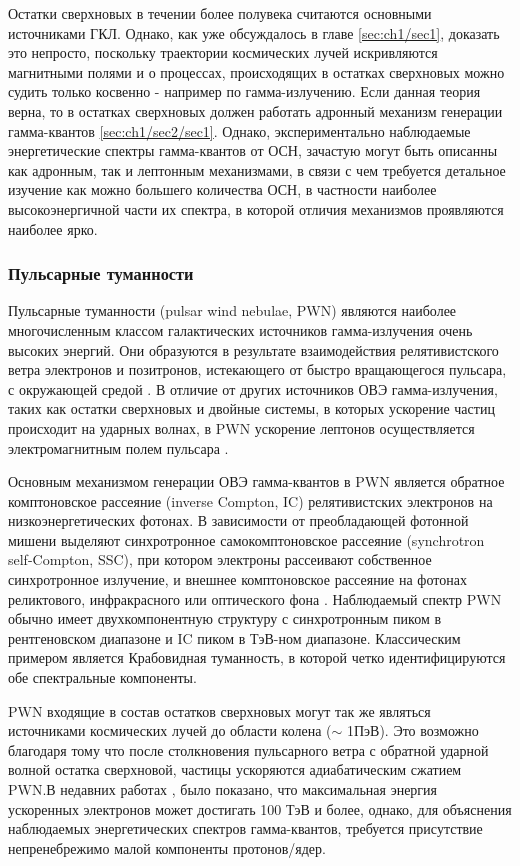 Остатки сверхновых в течении более полувека считаются основными источниками ГКЛ. Однако, как уже обсуждалось в главе \ref{sec:ch1/sec1}, доказать это непросто, поскольку траектории космических лучей искривляются магнитными полями и о процессах, происходящих в остатках сверхновых можно судить только косвенно - например по гамма-излучению. Если данная теория верна, то в остатках сверхновых должен работать адронный механизм генерации гамма-квантов \ref{sec:ch1/sec2/sec1}. Однако, экспериментально наблюдаемые энергетические спектры гамма-квантов от ОСН, зачастую могут быть описанны как адронным, так и лептонным механизмами, в связи с чем требуется детальное изучение как можно большего количества ОСН, в частности наиболее высокоэнергичной части их спектра, в которой отличия механизмов проявляются наиболее ярко.

\subsubsection{Пульсарные туманности}
Пульсарные туманности (pulsar wind nebulae, PWN) являются наиболее многочисленным классом галактических источников гамма-излучения очень высоких энергий. Они образуются в результате взаимодействия релятивистского ветра электронов и позитронов, истекающего от быстро вращающегося пульсара, с окружающей средой \cite{Gaensler_2006}. В отличие от других источников ОВЭ гамма-излучения, таких как остатки сверхновых и двойные системы, в которых ускорение частиц происходит на ударных волнах, в PWN ускорение лептонов осуществляется электромагнитным полем пульсара \cite{Gaisser_Engel_Resconi_2016}.

Основным механизмом генерации ОВЭ гамма-квантов в PWN является обратное комптоновское рассеяние (inverse Compton, IC) релятивистских электронов на низкоэнергетических фотонах. В зависимости от преобладающей фотонной мишени выделяют синхротронное самокомптоновское рассеяние (synchrotron self-Compton, SSC), при котором электроны рассеивают собственное синхротронное излучение, и внешнее комптоновское рассеяние на фотонах реликтового, инфракрасного или оптического фона  \cite{Gaensler_2006}. Наблюдаемый спектр PWN обычно имеет двухкомпонентную структуру с синхротронным пиком в рентгеновском диапазоне и IC пиком в ТэВ-ном диапазоне. Классическим примером является Крабовидная туманность, в которой четко идентифицируются обе спектральные компоненты.
 
PWN входящие в состав остатков сверхновых могут так же являться источниками космических лучей до области колена ($\sim$ 1ПэВ). Это возможно благодаря тому что после столкновения пульсарного ветра с обратной ударной волной остатка сверхновой, частицы ускоряются адиабатическим сжатием PWN\cite{PWN_cr_source}.В недавних работах \cite{Crab_PeV, Vela_HESS_Suzaku}, было показано, что максимальная энергия ускоренных электронов может достигать 100 ТэВ и более, однако, для объяснения наблюдаемых энергетических спектров гамма-квантов, требуется присутствие непренебрежимо малой компоненты протонов/ядер.

